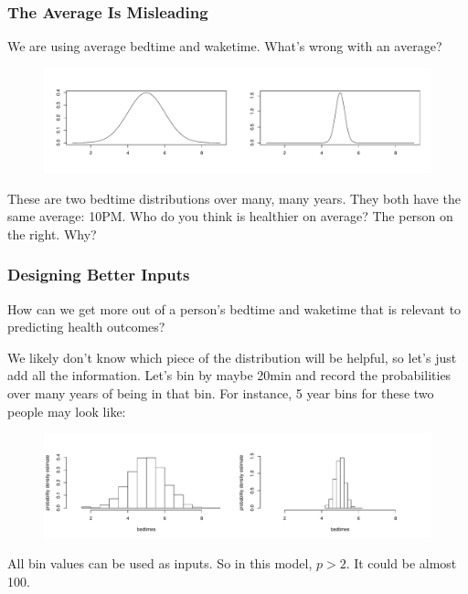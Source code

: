 \documentclass[slides]{beamer} %
\begin{document}
\begin{frame}\frametitle{The Average Is Misleading}

We are using average bedtime and waketime. What's wrong with an average?

\begin{figure}
\centering
\includegraphics[width=4.5in]{two_dist}
\end{figure}

%
	
These are two bedtime distributions over many, many years. They both have the same average: 10PM. Who do you think is healthier on average? The person on the right. Why?
\end{frame}

\begin{frame}\frametitle{Designing Better Inputs}

\small
How can we get more  out of a person's bedtime and waketime that is relevant to predicting health outcomes?

We likely don't know which piece of the distribution will be helpful, so let's just add all the information. Let's bin by maybe 20min and record the probabilities over many years of being in that bin. For instance, 5 year bins for these two people may look like:

%	

\begin{figure}
\centering
\includegraphics[width=4.5in]{two_hists}
\end{figure}

All bin values can be used as inputs. So in this model, $p > 2$. It could be almost 100.

\end{frame}
\end{document}
